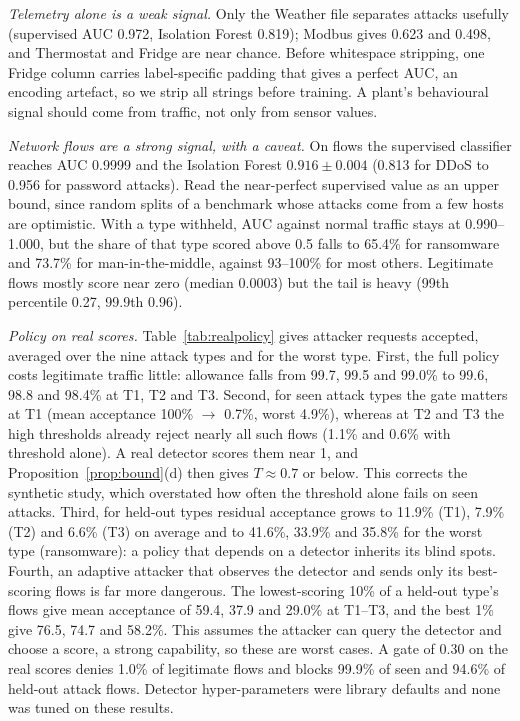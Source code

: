\emph{Telemetry alone is a weak signal.} Only the Weather file separates attacks usefully (supervised AUC 0.972, Isolation Forest 0.819); Modbus gives 0.623 and 0.498, and Thermostat and Fridge are near chance. Before whitespace stripping, one Fridge column carries label-specific padding that gives a perfect AUC, an encoding artefact, so we strip all strings before training. A plant's behavioural signal should come from traffic, not only from sensor values.

\emph{Network flows are a strong signal, with a caveat.} On flows the supervised classifier reaches AUC 0.9999 and the Isolation Forest $0.916\pm0.004$ (0.813 for DDoS to 0.956 for password attacks). Read the near-perfect supervised value as an upper bound, since random splits of a benchmark whose attacks come from a few hosts are optimistic. With a type withheld, AUC against normal traffic stays at 0.990--1.000, but the share of that type scored above 0.5 falls to 65.4\% for ransomware and 73.7\% for man-in-the-middle, against 93--100\% for most others. Legitimate flows mostly score near zero (median 0.0003) but the tail is heavy (99th percentile 0.27, 99.9th 0.96).

\emph{Policy on real scores.} Table~\ref{tab:realpolicy} gives attacker requests accepted, averaged over the nine attack types and for the worst type. First, the full policy costs legitimate traffic little: allowance falls from 99.7, 99.5 and 99.0\% to 99.6, 98.8 and 98.4\% at T1, T2 and T3. Second, for seen attack types the gate matters at T1 (mean acceptance 100\% $\to$ 0.7\%, worst 4.9\%), whereas at T2 and T3 the high thresholds already reject nearly all such flows (1.1\% and 0.6\% with threshold alone). A real detector scores them near 1, and Proposition~\ref{prop:bound}(d) then gives $T\approx0.7$ or below. This corrects the synthetic study, which overstated how often the threshold alone fails on seen attacks. Third, for held-out types residual acceptance grows to 11.9\% (T1), 7.9\% (T2) and 6.6\% (T3) on average and to 41.6\%, 33.9\% and 35.8\% for the worst type (ransomware): a policy that depends on a detector inherits its blind spots. Fourth, an adaptive attacker that observes the detector and sends only its best-scoring flows is far more dangerous. The lowest-scoring 10\% of a held-out type's flows give mean acceptance of 59.4, 37.9 and 29.0\% at T1--T3, and the best 1\% give 76.5, 74.7 and 58.2\%. This assumes the attacker can query the detector and choose a score, a strong capability, so these are worst cases. A gate of 0.30 on the real scores denies 1.0\% of legitimate flows and blocks 99.9\% of seen and 94.6\% of held-out attack flows. Detector hyper-parameters were library defaults and none was tuned on these results.

